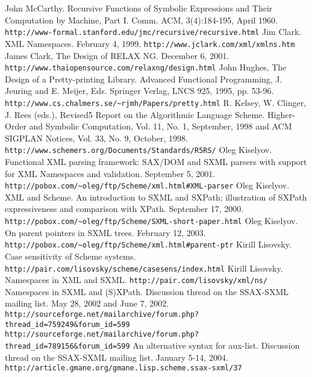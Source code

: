 \documentclass[10pt]{article}
\begin{document}
\begin{thebibliography}{}
 John McCarthy. Recursive Functions of Symbolic Expressions
and Their Computation by Machine, Part I. Comm. ACM, 3(4):184-195, April 1960. \texttt{http://www-formal.stanford.edu/jmc/recursive/recursive.html} 
 Jim Clark. XML Namespaces. February 4, 1999. \texttt{http://www.jclark.com/xml/xmlns.htm} 
 James Clark, The Design of RELAX NG. December 6, 2001. \texttt{http://www.thaiopensource.com/relaxng/design.html} 
 John Hughes, The Design of a Pretty-printing Library. Advanced Functional Programming, J. Jeuring and E. Meijer, Eds. Springer Verlag, LNCS 925, 1995, pp. 53-96. \texttt{http://www.cs.chalmers.se/\textasciitilde{}rjmh/Papers/pretty.html} 
 R. Kelsey, W. Clinger, J. Rees (eds.), Revised5 Report on
                      the Algorithmic Language Scheme. Higher-Order and
                      Symbolic Computation, Vol. 11, No. 1, September, 1998
                      and
                      ACM SIGPLAN Notices, Vol. 33, No. 9, October, 1998. \texttt{http://www.schemers.org/Documents/Standards/R5RS/} 
 Oleg Kiselyov. Functional XML parsing framework: SAX/DOM and
SXML parsers with support for XML Namespaces and validation. September
5, 2001. \texttt{http://pobox.com/\textasciitilde{}oleg/ftp/Scheme/xml.html\#XML-parser} 
 Oleg Kiselyov. XML and Scheme. An introduction to SXML and SXPath;
illustration of SXPath expressiveness and comparison with
XPath. September 17, 2000. \texttt{http://pobox.com/\textasciitilde{}oleg/ftp/Scheme/SXML-short-paper.html} 
 Oleg Kiselyov. On parent pointers in SXML trees. February 12, 2003. \texttt{http://pobox.com/\textasciitilde{}oleg/ftp/Scheme/xml.html\#parent-ptr} 
 Kirill Lisovsky. Case sensitivity of Scheme systems. \texttt{http://pair.com/lisovsky/scheme/casesens/index.html} 
 Kirill Lisovsky. Namespaces in XML and SXML.  \texttt{http://pair.com/lisovsky/xml/ns/} 
 Namespaces in SXML and (S)XPath. Discussion thread on the SSAX-SXML mailing list. May 28, 2002 and June 7, 2002. \texttt{http://sourceforge.net/mailarchive/forum.php?thread\_id=759249\&forum\_id=599}  \texttt{http://sourceforge.net/mailarchive/forum.php?thread\_id=789156\&forum\_id=599} 
 An alternative syntax for aux-list. Discussion thread on the SSAX-SXML mailing list. January 5-14, 2004. \texttt{http://article.gmane.org/gmane.lisp.scheme.ssax-sxml/37} 

\end{thebibliography}
\end{document}
